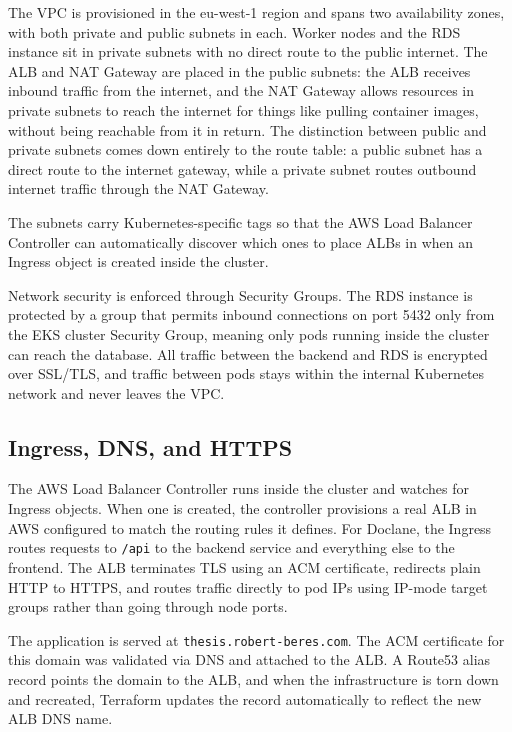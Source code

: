 \par The VPC is provisioned in the eu-west-1 region and spans two availability zones, with both private and public subnets in each. Worker nodes and the RDS instance sit in private subnets with no direct route to the public internet. The ALB and NAT Gateway are placed in the public subnets: the ALB receives inbound traffic from the internet, and the NAT Gateway allows resources in private subnets to reach the internet for things like pulling container images, without being reachable from it in return. The distinction between public and private subnets comes down entirely to the route table: a public subnet has a direct route to the internet gateway, while a private subnet routes outbound internet traffic through the NAT Gateway.

\par The subnets carry Kubernetes-specific tags so that the AWS Load Balancer Controller can automatically discover which ones to place ALBs in when an Ingress object is created inside the cluster.

\par Network security is enforced through Security Groups. The RDS instance is protected by a group that permits inbound connections on port 5432 only from the EKS cluster Security Group, meaning only pods running inside the cluster can reach the database. All traffic between the backend and RDS is encrypted over SSL/TLS, and traffic between pods stays within the internal Kubernetes network and never leaves the VPC.

\subsection{Ingress, DNS, and HTTPS}

\par The AWS Load Balancer Controller runs inside the cluster and watches for Ingress objects. When one is created, the controller provisions a real ALB in AWS configured to match the routing rules it defines. For Doclane, the Ingress routes requests to \texttt{/api} to the backend service and everything else to the frontend. The ALB terminates TLS using an ACM certificate, redirects plain HTTP to HTTPS, and routes traffic directly to pod IPs using IP-mode target groups rather than going through node ports.

\par The application is served at \texttt{thesis.robert-beres.com}. The ACM certificate for this domain was validated via DNS and attached to the ALB. A Route53 alias record points the domain to the ALB, and when the infrastructure is torn down and recreated, Terraform updates the record automatically to reflect the new ALB DNS name.

